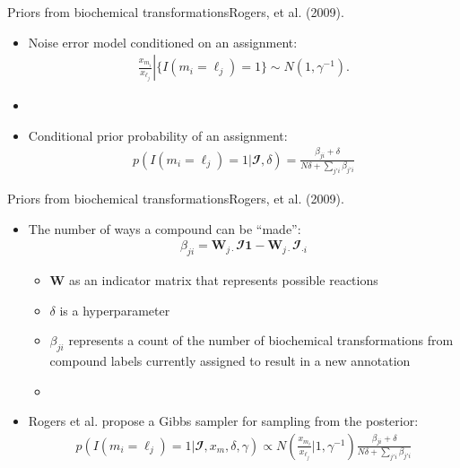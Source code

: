 \documentclass[xcolor=dvipsnames]{beamer}
\begin{document}
\begin{frame}{Priors from biochemical transformations}{Rogers, et al. (2009).}
	\vspace{-12pt}
	\begin{itemize}
		\item Noise error model conditioned on an assignment:
		\begin{align*}
		\left. \frac{x_{m_i}}{x_{\ell_j}} \right| \{ I(m_i=\ell_j )=1 \} \sim N\left(1, \gamma^{-1}\right).
		\end{align*} \pause
		\item[]
		\item Conditional prior probability of an assignment:
		\begin{align*}
		p( I(m_i=\ell_j )=1|\mathbfcal{I},\delta) =  \frac{\beta_{ji}+\delta}{N\delta+\sum_{j'i} \beta_{j'i}}
		\end{align*}
	\end{itemize}
\end{frame}

\begin{frame}{Priors from biochemical transformations}{Rogers, et al. (2009).}
	\vspace{-12pt}
	\begin{itemize}
		\item The number of ways a compound can be ``made'':
		\begin{align*}
		\beta_{ji}=\textbf{W}_{j \cdot} \mathbfcal{I} \textbf{1} - \textbf{W}_{j \cdot} \mathbfcal{I}_{\cdot i} 
		\end{align*}
		\begin{itemize}
					\item $\textbf{W}$ as an indicator matrix that represents possible reactions
					\item $\delta$ is a hyperparameter
					\item $\beta_{ji}$ represents a count of the number of biochemical transformations from compound labels currently assigned to result in a new annotation \pause
					\item[]
		\end{itemize}
		\item Rogers et al. propose a Gibbs sampler for sampling from the posterior:
			\begin{align*}
				p( I(m_i=\ell_j )=1|\mathbfcal{I},x_m,\delta,\gamma) \propto N \left( \frac{x_{m_i}}{x_{\ell_j}} | 1,\gamma^{-1} \right) \frac{\beta_{ji}+\delta}{N\delta+\sum_{j'i} \beta_{j'i}}
			\end{align*}
	\end{itemize}
\end{frame}
\end{document}
